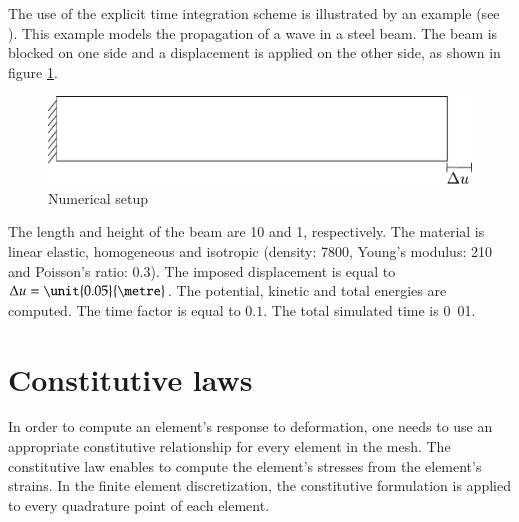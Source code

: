 The use  of the explicit  time integration scheme  is illustrated by  an example
(see  ).    This  example  models  the
propagation of  a wave in a  steel beam. The beam  is blocked on one  side and a
displacement   is   applied   on   the   other  side,   as   shown   in   figure
\ref{fig:smm:explicit}.

\begin{figure}[!htb]
  \centering
  \includegraphics[scale=.6]{figures/explicit_dynamic}
  \caption{Numerical setup \label{fig:smm:explicit}}
\end{figure}

The length  and height of  the beam are \unit{10}{\metre}  and \unit{1}{\metre},
respectively.   The  material  is  linear  elastic,  homogeneous  and  isotropic
(density:       \unit{7800}{\kilogrampercubicmetre},       Young's      modulus:
\unit{210}{\giga\pascal} and Poisson's  ratio: $0.3$).  The imposed displacement
is equal to  $\Delta u = \unit{0.05}{\metre}$. The  potential, kinetic and
total  energies are  computed.  The  time factor  is equal  to $0.1$.  The total
simulated time is \unit{0.01}{\second}.

\section{Constitutive laws \label{sect:smm:CL}}
In order to compute an element's response to deformation, one needs to use an
appropriate constitutive relationship for every element in the mesh. The
constitutive law enables to compute the element's stresses from the element's
strains. In the finite element discretization, the constitutive formulation is
applied to every quadrature point of each element.

